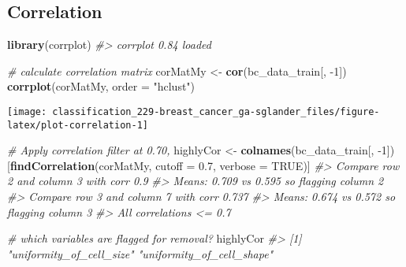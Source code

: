 \documentclass[]{book}
\newenvironment{Shaded}{\begin{snugshade}}{\end{snugshade}}
\newcommand{\CommentTok}[1]{\textcolor[rgb]{0.56,0.35,0.01}{\textit{#1}}}
\newcommand{\DataTypeTok}[1]{\textcolor[rgb]{0.13,0.29,0.53}{#1}}
\newcommand{\DecValTok}[1]{\textcolor[rgb]{0.00,0.00,0.81}{#1}}
\newcommand{\FloatTok}[1]{\textcolor[rgb]{0.00,0.00,0.81}{#1}}
\newcommand{\KeywordTok}[1]{\textcolor[rgb]{0.13,0.29,0.53}{\textbf{#1}}}
\newcommand{\NormalTok}[1]{#1}
\newcommand{\OtherTok}[1]{\textcolor[rgb]{0.56,0.35,0.01}{#1}}
\newcommand{\StringTok}[1]{\textcolor[rgb]{0.31,0.60,0.02}{#1}}
\begin{document}
\hypertarget{correlation-1}{%
\subsection{Correlation}\label{correlation-1}}

\begin{Shaded}
\begin{Highlighting}[]
\KeywordTok{library}\NormalTok{(corrplot)}
\CommentTok{#> corrplot 0.84 loaded}

\CommentTok{# calculate correlation matrix}
\NormalTok{corMatMy <-}\StringTok{ }\KeywordTok{cor}\NormalTok{(bc_data_train[, }\DecValTok{-1}\NormalTok{])}
\KeywordTok{corrplot}\NormalTok{(corMatMy, }\DataTypeTok{order =} \StringTok{"hclust"}\NormalTok{)}
\end{Highlighting}
\end{Shaded}

\begin{center}\texttt{[image: classification\_229-breast\_cancer\_ga-sglander\_files/figure-latex/plot-correlation-1]} \end{center}

\begin{Shaded}
\begin{Highlighting}[]
\CommentTok{# Apply correlation filter at 0.70,}
\NormalTok{highlyCor <-}\StringTok{ }\KeywordTok{colnames}\NormalTok{(bc_data_train[, }\DecValTok{-1}\NormalTok{])[}\KeywordTok{findCorrelation}\NormalTok{(corMatMy, }
                                                           \DataTypeTok{cutoff =} \FloatTok{0.7}\NormalTok{, }
                                                           \DataTypeTok{verbose =} \OtherTok{TRUE}\NormalTok{)]}
\CommentTok{#> Compare row 2  and column  3 with corr  0.9 }
\CommentTok{#>   Means:  0.709 vs 0.595 so flagging column 2 }
\CommentTok{#> Compare row 3  and column  7 with corr  0.737 }
\CommentTok{#>   Means:  0.674 vs 0.572 so flagging column 3 }
\CommentTok{#> All correlations <= 0.7}
\end{Highlighting}
\end{Shaded}

\begin{Shaded}
\begin{Highlighting}[]
\CommentTok{# which variables are flagged for removal?}
\NormalTok{highlyCor}
\CommentTok{#> [1] "uniformity_of_cell_size"  "uniformity_of_cell_shape"}
\end{Highlighting}
\end{Shaded}
\end{document}
